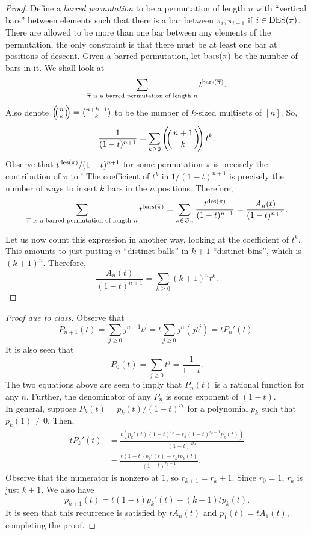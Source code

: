 	\begin{proof}
		Define a \emph{barred permutation} to be a permutation of length $n$ with ``vertical bars'' between elements such that there is a bar between $\pi_i,\pi_{i+1}$ if $i \in \operatorname{DES}(\pi)$. There are allowed to be more than one bar between any elements of the permutation, the only constraint is that there must be at least one bar at positions of descent. Given a barred permutation, let $\operatorname{bars}(\pi)$ be the number of bars in it. We shall look at
		\begin{equation}
			\label{eqn: counting to carlitz identity}
			\sum_{\overline{\pi} \text{ is a barred permutation of length $n$}} t^{\operatorname{bars}(\overline{\pi})}.
		\end{equation}
		Also denote $\mbinom{n}{k} = \binom{n+k-1}{k}$ to be the number of $k$-sized multisets of $[n]$. So,
		\[ \frac{1}{(1-t)^{n+1}} = \sum_{k \ge 0} \mbinom{n+1}{k} t^k. \]
		Observe that $t^{\operatorname{des}(\pi)}/(1-t)^{n+1}$ for some permutation $\pi$ is precisely the contribution of $\pi$ to ! The coefficient of $t^k$ in $1/(1-t)^{n+1}$ is precisely the number of ways to insert $k$ bars in the $n$ positions. Therefore,
		\[ \sum_{\overline{\pi} \text{ is a barred permutation of length $n$}} t^{\operatorname{bars}(\overline{\pi})} = \sum_{\pi \in \mathfrak{S}_n} \frac{t^{\operatorname{des}(\pi)}}{(1-t)^{n+1}} = \frac{A_n(t)}{(1-t)^{n+1}}. \]

		Let us now count this expression in another way, looking at the coefficient of $t^k$. This amounts to just putting $n$ ``distinct balls'' in $k+1$ ``distinct bins'', which is $(k+1)^n$. Therefore,
		\[ \frac{A_n(t)}{(1-t)^{n+1}} = \sum_{k \ge 0} (k+1)^n t^k. \] 
	\end{proof}

	\begin{proof}[Proof due to class]
		Observe that
		\[ P_{n+1}(t) = \sum_{j \ge 0} j^{n+1} t^j = t \sum_{j \ge 0} j^n (jt^j) = t P_n'(t). \]
		It is also seen that
		\[ P_0(t) = \sum_{j \ge 0} t^j = \frac{1}{1-t}. \]
		The two equations above are seen to imply that $P_n(t)$ is a rational function for any $n$. Further, the denominator of any $P_n$ is some exponent of $(1-t)$. \\
		In general, suppose $P_k(t) = p_k(t)/(1-t)^{r_k}$ for a polynomial $p_k$ such that $p_k(1) \ne 0$. Then,
		\begin{align*}
			tP_k'(t) &= \frac{t \left( p_k'(t) (1-t)^{r_k} - r_k (1-t)^{r_k - 1} p_k(t) \right)}{(1-t)^{2r_k}} \\
				&= \frac{ t(1-t)p_k'(t) - r_k t p_k(t) }{(1-t)^{r_k+1}}.
		\end{align*}
		Observe that the numerator is nonzero at $1$, so $r_{k+1} = r_k + 1$. Since $r_0 = 1$, $r_k$ is just $k+1$. We also have
		\[ p_{k+1}(t) = t (1-t) p_k'(t) - (k+1) t p_k(t). \]
		It is seen that this recurrence is satisfied by $tA_n(t)$ and $p_1(t) = tA_1(t)$, completing the proof.
	\end{proof}

